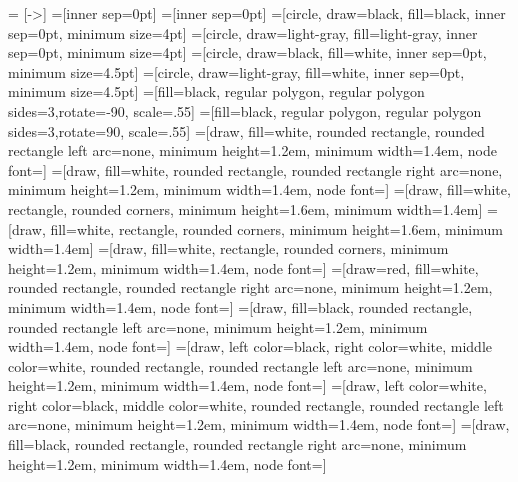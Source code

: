 

 = [->]
=[inner sep=0pt]
=[inner sep=0pt]
=[circle, draw=black, fill=black, inner sep=0pt, minimum size=4pt]
=[circle, draw=light-gray, fill=light-gray, inner sep=0pt, minimum size=4pt]
=[circle, draw=black, fill=white, inner sep=0pt, minimum size=4.5pt]
=[circle, draw=light-gray, fill=white, inner sep=0pt, minimum size=4.5pt]
=[fill=black, regular polygon, regular polygon sides=3,rotate=-90, scale=.55]
=[fill=black, regular polygon, regular polygon sides=3,rotate=90, scale=.55]
=[draw, fill=white, rounded rectangle, rounded rectangle left arc=none, minimum height=1.2em, minimum width=1.4em, node font={\scriptsize}]
=[draw, fill=white, rounded rectangle, rounded rectangle right arc=none, minimum height=1.2em, minimum width=1.4em, node font={\scriptsize}]
=[draw, fill=white, rectangle, rounded corners, minimum height=1.6em, minimum width=1.4em]
=[draw, fill=white, rectangle, rounded corners, minimum height=1.6em, minimum width=1.4em]
=[draw, fill=white, rectangle, rounded corners, minimum height=1.2em, minimum width=1.4em, node font={\scriptsize}]
=[draw=red, fill=white, rounded rectangle, rounded rectangle right arc=none, minimum height=1.2em, minimum width=1.4em, node font={\scriptsize}]
=[draw, fill=black, rounded rectangle, rounded rectangle left arc=none, minimum height=1.2em, minimum width=1.4em, node font={\scriptsize}]
=[draw, left color=black, right color=white, middle color=white, rounded rectangle, rounded rectangle left arc=none, minimum height=1.2em, minimum width=1.4em, node font={\scriptsize}]
=[draw, left color=white, right color=black, middle color=white, rounded rectangle, rounded rectangle left arc=none, minimum height=1.2em, minimum width=1.4em, node font={\scriptsize}]
=[draw, fill=black, rounded rectangle, rounded rectangle right arc=none, minimum height=1.2em, minimum width=1.4em, node font={\scriptsize}]
